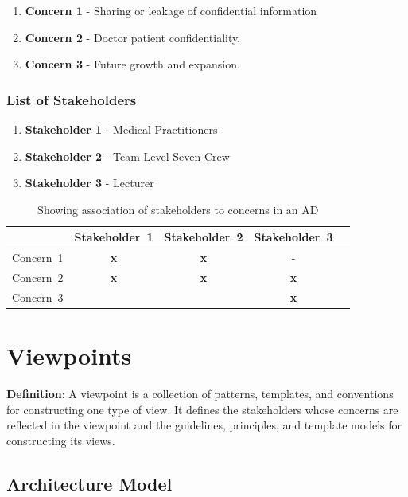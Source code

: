 \documentclass[10pt,oneside]{report}
\begin{document}
\begin{enumerate}
\item \textbf{Concern 1} - Sharing or leakage of confidential information
\item \textbf{Concern 2} - Doctor patient confidentiality. 
\item \textbf{Concern 3} - Future growth and expansion. 
\end{enumerate}

\subsection{List of Stakeholders}

\begin{enumerate}
\item \textbf{Stakeholder 1} - Medical Practitioners
\item \textbf{Stakeholder 2} - Team Level Seven Crew 
\item \textbf{Stakeholder 3} - Lecturer 
\end{enumerate}

\begin{table}[h]
\caption{Showing association of stakeholders to concerns in an AD}\label{stakeholders concerns}
\begin{tabular}{ l | c | c | c | c }
& \textsf{Stakeholder~1} & \textsf{Stakeholder~2} & \textsf{Stakeholder~3} & \\
\hline
\textsf{Concern~1} & \textbf{x} & \textbf{x} & - & \\
\textsf{Concern~2} & \textbf{x} & \textbf{x} & \textbf{x} & \\
\textsf{Concern~3} &  &  & \textbf{x} & \\
\hline
\end{tabular}
\end{table}

\chapter{Viewpoints}\label{ad:vps}

\textbf{Definition}: A viewpoint is a collection of patterns, templates, and conventions for constructing one type of view. It defines the stakeholders whose concerns are reflected in the viewpoint and the guidelines, principles, and template models for constructing its views.

\section{Architecture Model}\label{mk:list}
\end{document}
